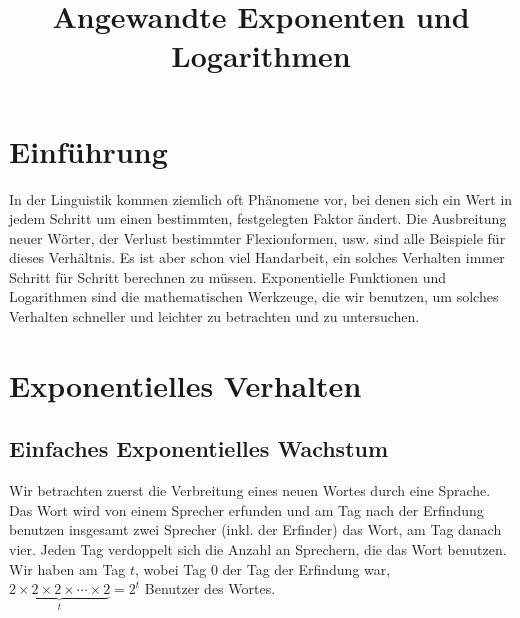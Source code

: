 \documentclass[a4paper,12pt,oneside,leqno]{scrartcl}%
\title{Angewandte Exponenten und Logarithmen}
\date{}
\begin{document}
\newtheorem{pos}{Postulate}[section]
\newtheorem{thm}{Theorem}[section]
\theoremstyle{lemma}
\newtheorem{lem}{Lemma}[section]

\theoremstyle{definition}
\newtheorem{defn}{Definition}
\newtheorem*{definition}{Definition}


\maketitle

\section{Einführung}

In der Linguistik kommen  ziemlich oft Phänomene vor, bei denen sich ein Wert in jedem Schritt um einen bestimmten, festgelegten Faktor ändert.  Die Ausbreitung neuer Wörter, der Verlust bestimmter Flexionformen, usw. sind alle Beispiele für dieses Verhältnis.   Es ist aber schon viel Handarbeit, ein solches Verhalten immer Schritt für Schritt berechnen zu müssen.  Exponentielle Funktionen und Logarithmen  sind die mathematischen Werkzeuge, die wir benutzen, um solches Verhalten schneller und leichter zu betrachten und zu untersuchen.

\section{Exponentielles Verhalten}
\subsection{Einfaches Exponentielles Wachstum}\label{sec:expwachs}
Wir betrachten zuerst die Verbreitung eines neuen Wortes durch eine Sprache.  Das Wort wird von einem Sprecher erfunden und am Tag nach der Erfindung benutzen insgesamt zwei Sprecher (inkl. der Erfinder) das Wort, am Tag danach vier.   Jeden Tag verdoppelt sich die Anzahl an Sprechern, die das Wort benutzen. Wir haben am Tag $t$, wobei Tag 0 der Tag der Erfindung war, $\underbrace{2\times{}2\times{}2\times{}\cdots{}\times{}2}_{t} = 2^{t}$ Benutzer des Wortes.  
\end{document}
